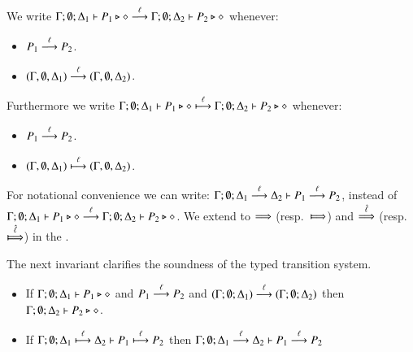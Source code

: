 \begin{definition}\label{d:tlts}\rm
	We write
	$\Gamma; \emptyset; \Delta_1 \proves P_1 \hastype \Proc \by{\ell} \Gamma; \emptyset; \Delta_2 \proves P_2 \hastype \Proc$
	whenever:
%
	\begin{itemize}
		\item	$P_1 \by{\ell} P_2$.
		\item	$(\Gamma, \emptyset, \Delta_1) \by{\ell} (\Gamma, \emptyset, \Delta_2)$.
	\end{itemize}
%

	Furthermore we write
	$\Gamma; \emptyset; \Delta_1 \proves P_1 \hastype \Proc \hby{\ell} \Gamma; \emptyset; \Delta_2 \proves P_2 \hastype \Proc$
	whenever:
%
	\begin{itemize}
		\item	$P_1 \by{\ell} P_2$.
		\item	$(\Gamma, \emptyset, \Delta_1) \hby{\ell} (\Gamma, \emptyset, \Delta_2)$.
	\end{itemize}
%
\end{definition}

For notational convenience we can write:
$\horel{\Gamma}{\Delta_1}{P_1}{\by{\ell}}{\Delta_2}{P_2}$,
instead of $\Gamma; \emptyset; \Delta_1 \proves P_1 \hastype \Proc \by{\ell} \Gamma; \emptyset; \Delta_2 \proves P_2 \hastype \Proc$.
We extend to $\By{}$ (resp.\ $\Hby{}$) and $\By{\hat{\ell}}$ (resp.\ $\Hby{\hat{\ell}}$) in the .

The next invariant clarifies the soundness of the
typed transition system.

\begin{lemma}[Invariant]\label{l:invariant}
	\begin{itemize}
		\item	If $\Gamma; \emptyset; \Delta_1 \proves P_1 \hastype \Proc$ and
			$P_1 \by{\ell} P_2$ and $(\Gamma; \emptyset; \Delta_1) \by{\ell} (\Gamma; \emptyset; \Delta_2)$
			then $\Gamma; \emptyset; \Delta_2 \proves P_2 \hastype \Proc$.

		\item	If $\horel{\Gamma}{\Delta_1}{P_1}{\hby{\ell}}{\Delta_2}{P_2}$
			then $\horel{\Gamma}{\Delta_1}{P_1}{\by{\ell}}{\Delta_2}{P_2}$

	\end{itemize}
\end{lemma}

